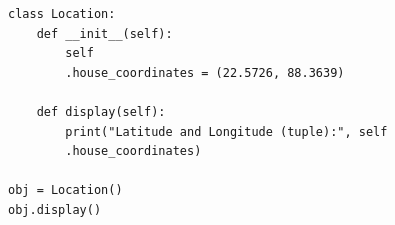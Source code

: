 \begin{verbatim}
class Location:
    def __init__(self):
        self
        .house_coordinates = (22.5726, 88.3639)

    def display(self):
        print("Latitude and Longitude (tuple):", self
        .house_coordinates)

obj = Location()
obj.display()
\end{verbatim}